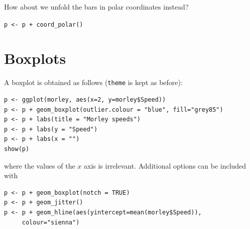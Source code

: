 How about we unfold the bars in polar coordinates
instead?

\texttt{p <- p + coord\_polar()}

\section{Boxplots}
A boxplot is obtained as follows (\texttt{theme} is kept as before):
\begin{verbatim}
p <- ggplot(morley, aes(x=2, y=morley$Speed))
p <- p + geom_boxplot(outlier.colour = "blue", fill="grey85") 
p <- p + labs(title = "Morley speeds")
p <- p + labs(y = "Speed")
p <- p + labs(x = "")
show(p)
\end{verbatim}
where the values of the $x$ axis is irrelevant. Additional options
can be included with
\begin{verbatim}
p <- p + geom_boxplot(notch = TRUE) 
p <- p + geom_jitter() 
p <- p + geom_hline(aes(yintercept=mean(morley$Speed)), 
	 colour="sienna")
\end{verbatim}

